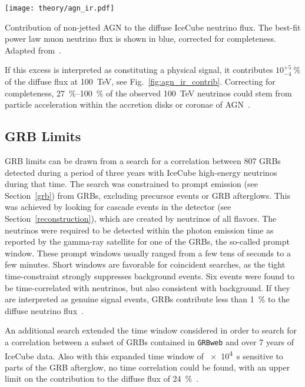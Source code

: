 \begin{marginfigure}
    \texttt{[image: theory/agn\_ir.pdf]}
    \caption[Non-jetted AGN]{Contribution of non-jetted AGN to the diffuse IceCube neutrino flux. The best-fit power law muon neutrino flux is shown in blue, corrected for completeness. Adapted from~\cite{Abbasi2022c}.}
\end{marginfigure}

If this excess is interpreted as constituting a physical signal, it contributes $10^{+5}_{-4} ~\%$ of the diffuse flux at \SI{100}{\tera\eV}, see Fig.~\ref{fig:agn_ir_contrib}. Correcting for completeness, \SIrange{27}{100}{\percent} of the observed \SI{100}{\tera\eV} neutrinos could stem from particle acceleration within the accretion disks or coronae of AGN~\cite{Abbasi2022c}.

\subsection{GRB Limits}
GRB limits can be drawn from a search for a correlation between 807 GRBs detected during a period of three years with IceCube high-energy neutrinos during that time. The search was constrained to prompt emission (see Section~\ref{grb}) from GRBs, excluding precursor events or GRB afterglows. This was achieved by looking for cascade events in the detector (see Section~\ref{reconstruction}), which are created by neutrinos of all flavors. The neutrinos were required to be detected within the photon emission time as reported by the gamma-ray satellite for one of the GRBs, the so-called prompt window. These prompt windows usually ranged from a few tens of seconds to a few minutes. Short windows are favorable for coincident searches, as the tight time-constraint strongly suppresses background events. Six events were found to be time-correlated with neutrinos, but also consistent with background. If they are interpreted as genuine signal events, GRBs contribute less than \SI{1}{\percent} to the diffuse neutrino flux~.

An additional search extended the time window considered in order to search for a correlation between a subset of GRBs contained in \texttt{GRBweb} and over 7 years of IceCube data. Also with this expanded time window of \SI{e4}{s} sensitive to parts of the GRB afterglow, no time correlation could be found, with an upper limit on the contribution to the diffuse flux of \SI{24}{\percent}~.

